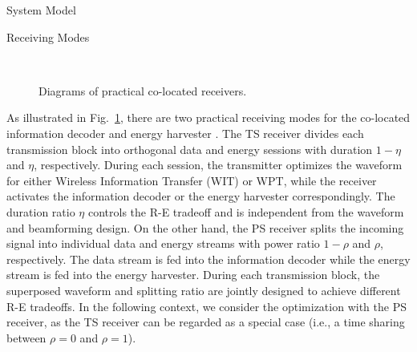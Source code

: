 \documentclass[journal]{IEEEtran}
\begin{document}
\begin{section}{System Model}
		\begin{subsection}{Receiving Modes}
			\begin{figure}[!t]
				\centering
				\\
				\caption{Diagrams of practical co-located receivers.}
				\label{fi:receiver}
			\end{figure}

			As illustrated in Fig.~\ref{fi:receiver}, there are two practical receiving modes for the co-located information decoder and energy harvester \cite{Zhou2013}. The TS receiver divides each transmission block into orthogonal data and energy sessions with duration $1-\eta$ and $\eta$, respectively. During each session, the transmitter optimizes the waveform for either Wireless Information Transfer (WIT) or WPT, while the receiver activates the information decoder or the energy harvester correspondingly. The duration ratio $\eta$ controls the R-E tradeoff and is independent from the waveform and beamforming design. On the other hand, the PS receiver splits the incoming signal into individual data and energy streams with power ratio $1-\rho$ and $\rho$, respectively. The data stream is fed into the information decoder while the energy stream is fed into the energy harvester. During each transmission block, the superposed waveform and splitting ratio are jointly designed to achieve different R-E tradeoffs. In the following context, we consider the optimization with the PS receiver, as the TS receiver can be regarded as a special case (i.e., a time sharing between $\rho=0$ and $\rho=1$).
		\end{subsection}



\end{section}
\end{document}
